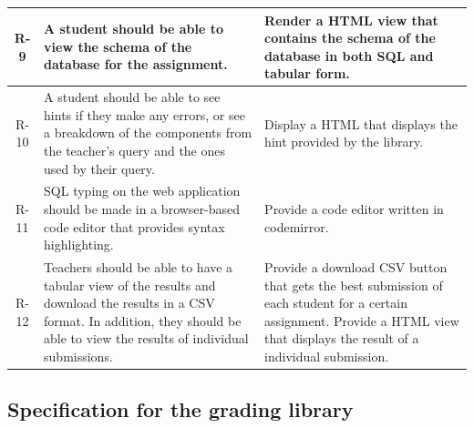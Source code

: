 \begin{tabularx}{\textwidth}{|c|Y|Y|}
  R-9 & A student should be able to view the schema of the database for the assignment. & Render a HTML view that contains the schema of the database in both SQL and tabular form. \\\hline
  R-10 & A  student  should  be  able  to  see  hints  if  they make any  errors, or see a breakdown of the components from the teacher’s query and the ones used by their query. & Display a HTML that displays the hint provided by the library. \\\hline
  R-11 & SQL typing on the web application should be made in a browser-based code editor that provides syntax highlighting. & Provide a code editor written in codemirror. \\\hline
  R-12 & Teachers should be able to have a tabular view of the results and download the results in  a CSV format.   In  addition,  they  should  be  able  to  view  the  results  of individual submissions. & Provide a download CSV button that gets the best submission of each student for a certain assignment. Provide a HTML view that displays the result of a individual submission. \\\hline
\end{tabularx}

\subsection{Specification for the grading library}

